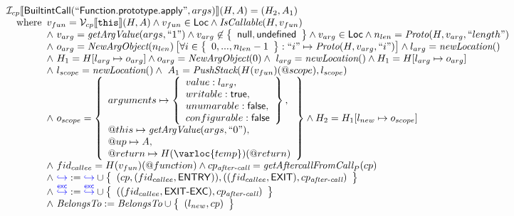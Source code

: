\[\begin{array}{l}
\I _{cp}\lbr \SF{BuiltintCall}(``\SF{Function.prototype.apply}",args)\rbr(H,A) = (H_2, A_1)\\
\quad\wherec{
  v_{fun} = \V _{cp}\lbr \TT{this}\rbr (H,A) \land v_{fun} \in \SF{Loc} \land \hf{IsCallable}(H,v_{fun})\\
  \land\ v_{arg} = \hf{getArgValue}(args, ``1") \land v_{arg} \not\in \set{\SF{null},\SF{undefined}}
  \land v_{arg} \in \SF{Loc} \land n_{len} = \hf{Proto}(H,v_{arg},``length")\\
  \land\ o_{arg} = \hf{NewArgObject}(n_{len})\left[ \forall i \in \set{0, ..., n_{len}-1}: 
    ``i" \mapsto \hf{Proto}(H,v_{arg},``i") \right] \land l_{arg} = \hf{newLocation}()\\
  \land\ H_1 = H[l_{arg} \mapsto o_{arg}] \land o_{arg} = \hf{NewArgObject}(0)
  \land\ l_{arg} = \hf{newLocation}() \land H_1 = H[l_{arg} \mapsto o_{arg}]\\
  \land\ l_{scope} = \hf{newLocation}()
  \land\ A_1=\hf{PushStack}(H(v_{fun})(\varprop{scope}),l_{scope}) \\
  \land\ o_{scope} = \set{
    arguments \mapsto \set{value : l_{arg},\\ 
      writable : \SF{true},\\ unumarable : \SF{false},\\ configurable : \SF{false}},\\
    \varprop{this} \mapsto \hf{getArgValue}(args, ``0"),\\
    \varprop{up} \mapsto A,\\
    \varprop{return} \mapsto H(\varloc{temp})(\varprop{return})}
  \land H_2 = H_1[l_{new} \mapsto o_{scope}]\\
  \land\ fid_{callee}= H(v_{fun})(\varprop{function})
  \land cp_{\textit{after-call}} = \hf{getAftercallFromCall}_P(cp) \\
  \land\ {\inblue \cfgnext} :=
  {\inblue \cfgnext}\cup\set{( cp,(fid_{callee},\SF{ENTRY})),
    ((fid_{callee},\SF{EXIT}), cp_{\textit{after-call}})}\\
  \land\ {\inblue \excnext}:={\inblue \excnext}
  \cup\set{((fid_{callee},\SF{EXIT-EXC}), cp_{\textit{after-call}})}\\
  \land\ \hf{BelongsTo}:=\hf{BelongsTo}\cup\set{(l_{new},cp)}
  }\\
\\\\


\end{array}
\]


